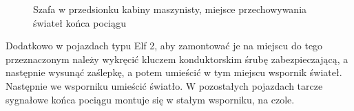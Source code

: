 \begin{figure}
		\caption{Szafa w przedsionku kabiny maszynisty, miejsce przechowywania świateł końca pociągu}
\end{figure}
Dodatkowo w pojazdach typu Elf 2, aby zamontować je na miejscu do tego przeznaczonym należy wykręcić kluczem konduktorskim śrubę zabezpieczającą, a następnie wysunąć zaślepkę, a potem umieścić w tym miejscu wspornik świateł. Następnie we wsporniku umieścić światło. W pozostałych pojazdach tarcze sygnałowe końca pociągu montuje się w stałym wsporniku, na czole.

